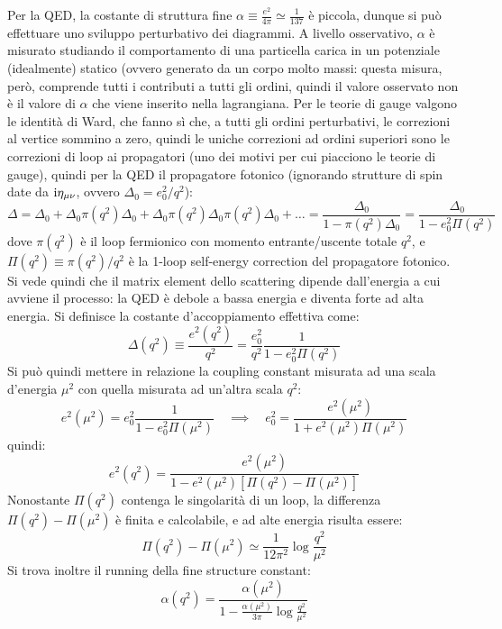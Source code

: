 Per la QED, la costante di struttura fine $ \alpha \equiv \frac{e^2}{4\pi} \simeq \frac{1}{137} $ è piccola, dunque si può effettuare uno sviluppo perturbativo dei diagrammi. A livello osservativo, $ \alpha $ è misurato studiando il comportamento di una particella carica in un potenziale (idealmente) statico (ovvero generato da un corpo molto massi: questa misura, però, comprende tutti i contributi a tutti gli ordini, quindi il valore osservato non è il valore di $ \alpha $ che viene inserito nella lagrangiana. Per le teorie di gauge valgono le identità di Ward, che fanno sì che, a tutti gli ordini perturbativi, le correzioni al vertice sommino a zero, quindi le uniche correzioni ad ordini superiori sono le correzioni di loop ai propagatori (uno dei motivi per cui piacciono le teorie di gauge), quindi per la QED il propagatore fotonico (ignorando strutture di spin date da $ \mathrm{i} \eta_{\mu \nu} $, ovvero $ \Delta_0 = e_0^2 / q^2 $):
\begin{equation*}
  \Delta = \Delta_0 + \Delta_0 \pi(q^2) \Delta_0 + \Delta_0 \pi(q^2) \Delta_0 \pi(q^2) \Delta_0 + \dots = \frac{\Delta_0}{1 - \pi(q^2) \Delta_0} = \frac{\Delta_0}{1 - e_0^2 \Pi(q^2)}
\end{equation*}
dove $ \pi(q^2) $ è il loop fermionico con momento entrante/uscente totale $ q^2 $, e $ \Pi(q^2) \equiv \pi(q^2) / q^2 $ è la 1-loop self-energy correction del propagatore fotonico. Si vede quindi che il matrix element dello scattering dipende dall'energia a cui avviene il processo: la QED è debole a bassa energia e diventa forte ad alta energia. Si definisce la costante d'accoppiamento effettiva come:
\begin{equation*}
  \Delta(q^2) \equiv \frac{e^2(q^2)}{q^2} = \frac{e_0^2}{q^2} \frac{1}{1 - e_0^2 \Pi(q^2)}
\end{equation*}
Si può quindi mettere in relazione la coupling constant misurata ad una scala d'energia $ \mu^2 $ con quella misurata ad un'altra scala $ q^2 $:
\begin{equation*}
  e^2(\mu^2) = e_0^2 \frac{1}{1 - e_0^2 \Pi(\mu^2)}
  \quad \implies \quad
  e_0^2 = \frac{e^2(\mu^2)}{1 + e^2(\mu^2) \Pi(\mu^2)}
\end{equation*}
quindi:
\begin{equation*}
  e^2(q^2) = \frac{e^2(\mu^2)}{1 - e^2(\mu^2) [ \Pi(q^2) - \Pi(\mu^2) ]}
\end{equation*}
Nonostante $ \Pi(q^2) $ contenga le singolarità di un loop, la differenza $ \Pi(q^2) - \Pi(\mu^2) $ è finita e calcolabile, e ad alte energia risulta essere:
\begin{equation*}
  \Pi(q^2) - \Pi(\mu^2) \simeq \frac{1}{12\pi^2} \log \frac{q^2}{\mu^2}
\end{equation*}
Si trova inoltre il running della fine structure constant:
\begin{equation*}
  \alpha(q^2) = \frac{\alpha(\mu^2)}{1 - \frac{\alpha(\mu^2)}{3\pi} \log \frac{q^2}{\mu^2}}
\end{equation*}

